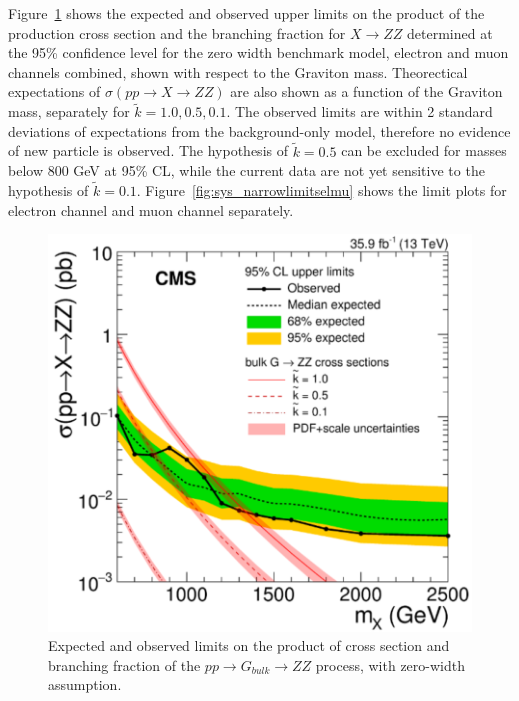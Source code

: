 \vspace{0.3cm}
Figure~\ref{fig:sys_narrowlimits} shows the expected and observed upper limits on the product of the production cross section and the branching fraction for $X\rightarrow ZZ$ determined at the 95\% confidence level for the zero width benchmark model, electron and muon channels combined, shown with respect to the Graviton mass. Theorectical expectations of $\sigma(pp\rightarrow X\rightarrow ZZ)$ are also shown as a function of the Graviton mass, separately for $\tilde{k}=1.0,0.5,0.1$. The observed limits are within 2 standard deviations of expectations from the background-only model, therefore no evidence of new particle is observed. The hypothesis of $\tilde{k}=0.5$ can be excluded for masses below 800 GeV at 95\% CL, while the current data are not yet sensitive to the hypothesis of $\tilde{k}=0.1$. Figure~\ref{fig:sys_narrowlimitselmu} shows the limit plots for electron channel and muon channel separately.

\begin{figure}[htbp]
\begin{center}
\includegraphics[width=0.9\linewidth]{figures/sys_narrowlimit.png}
\caption{Expected and observed limits on the product of cross section and branching fraction of the $pp\rightarrow G_{bulk}\rightarrow ZZ$ process, with zero-width assumption.}
\label{fig:sys_narrowlimits}
\end{center}
\end{figure}

